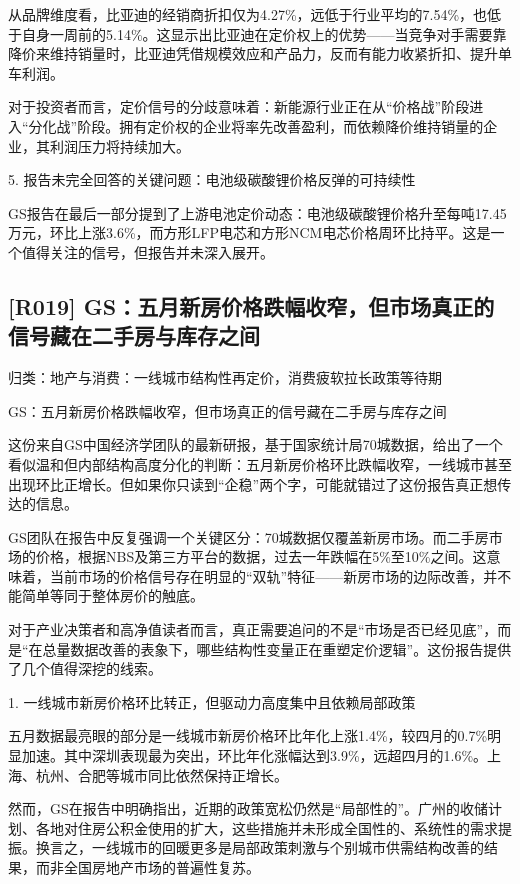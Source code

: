 \documentclass[11pt]{ctexart}
\begin{document}
从品牌维度看，比亚迪的经销商折扣仅为4.27\%，远低于行业平均的7.54\%，也低于自身一周前的5.14\%。这显示出比亚迪在定价权上的优势——当竞争对手需要靠降价来维持销量时，比亚迪凭借规模效应和产品力，反而有能力收紧折扣、提升单车利润。

对于投资者而言，定价信号的分歧意味着：新能源行业正在从“价格战”阶段进入“分化战”阶段。拥有定价权的企业将率先改善盈利，而依赖降价维持销量的企业，其利润压力将持续加大。

5. 报告未完全回答的关键问题：电池级碳酸锂价格反弹的可持续性

GS报告在最后一部分提到了上游电池定价动态：电池级碳酸锂价格升至每吨17.45万元，环比上涨3.6\%，而方形LFP电芯和方形NCM电芯价格周环比持平。这是一个值得关注的信号，但报告并未深入展开。

\subsection{[R019] GS：五月新房价格跌幅收窄，但市场真正的信号藏在二手房与库存之间}
{\small\color{refgray}归类：地产与消费：一线城市结构性再定价，消费疲软拉长政策等待期}

GS：五月新房价格跌幅收窄，但市场真正的信号藏在二手房与库存之间

这份来自GS中国经济学团队的最新研报，基于国家统计局70城数据，给出了一个看似温和但内部结构高度分化的判断：五月新房价格环比跌幅收窄，一线城市甚至出现环比正增长。但如果你只读到“企稳”两个字，可能就错过了这份报告真正想传达的信息。

GS团队在报告中反复强调一个关键区分：70城数据仅覆盖新房市场。而二手房市场的价格，根据NBS及第三方平台的数据，过去一年跌幅在5\%至10\%之间。这意味着，当前市场的价格信号存在明显的“双轨”特征——新房市场的边际改善，并不能简单等同于整体房价的触底。

对于产业决策者和高净值读者而言，真正需要追问的不是“市场是否已经见底”，而是“在总量数据改善的表象下，哪些结构性变量正在重塑定价逻辑”。这份报告提供了几个值得深挖的线索。

1. 一线城市新房价格环比转正，但驱动力高度集中且依赖局部政策

五月数据最亮眼的部分是一线城市新房价格环比年化上涨1.4\%，较四月的0.7\%明显加速。其中深圳表现最为突出，环比年化涨幅达到3.9\%，远超四月的1.6\%。上海、杭州、合肥等城市同比依然保持正增长。

然而，GS在报告中明确指出，近期的政策宽松仍然是“局部性的”。广州的收储计划、各地对住房公积金使用的扩大，这些措施并未形成全国性的、系统性的需求提振。换言之，一线城市的回暖更多是局部政策刺激与个别城市供需结构改善的结果，而非全国房地产市场的普遍性复苏。
\end{document}
